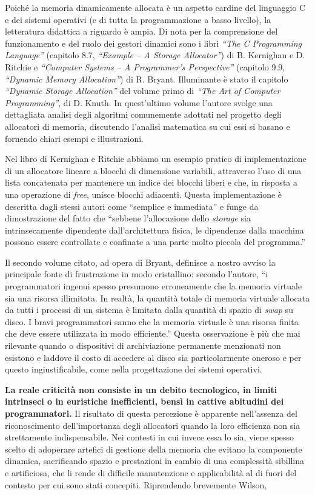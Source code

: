 Poiché la memoria dinamicamente allocata è un aspetto cardine del linguaggio C e dei sistemi operativi (e di tutta la programmazione a basso livello), la letteratura didattica a riguardo è ampia. Di nota per la comprensione del funzionamento e del ruolo dei gestori dinamici sono i libri \textit{``The C Programming Language''} (capitolo 8.7, \textit{``Example – A Storage Allocator''}) di B. Kernighan e D. Ritchie\cite{kernighan1988} e \textit{``Computer Systems – A Programmer’s Perspective''} (capitolo 9.9, \textit{``Dynamic Memory Allocation''}) di R. Bryant\cite{bryant2015}. Illuminante è stato il capitolo \textit{``Dynamic Storage Allocation''} del volume primo di \textit{``The Art of Computer Programming''}, di D. Knuth\cite{knuth1997}. In quest'ultimo volume l'autore svolge una dettagliata analisi degli algoritmi comunemente adottati nel progetto degli allocatori di memoria, discutendo l’analisi matematica su cui essi si basano e fornendo chiari esempi e illustrazioni.

Nel libro di Kernighan e Ritchie abbiamo un esempio pratico di implementazione di un allocatore lineare a blocchi di dimensione variabili, attraverso l’uso di una lista concatenata per mantenere un indice dei blocchi liberi e che, in risposta a una operazione di \textit{free}, unisce blocchi adiacenti. Questa implementazione è descritta dagli stessi autori come ``semplice e immediata'' e funge da dimostrazione del fatto che ``sebbene l’allocazione dello \textit{storage} sia intrinsecamente dipendente dall’architettura fisica, le dipendenze dalla macchina possono essere controllate e confinate a una parte molto piccola del programma.''

Il secondo volume citato, ad opera di Bryant, definisce a nostro avviso la principale fonte di frustrazione in modo cristallino: secondo l’autore, ``i programmatori ingenui spesso presumono erroneamente che la memoria virtuale sia una risorsa illimitata. In realtà, la quantità totale di memoria virtuale allocata da tutti i processi di un sistema è limitata dalla quantità di spazio di \textit{swap} su disco. I bravi programmatori sanno che la memoria virtuale è una risorsa finita che deve essere utilizzata in modo efficiente.'' Questa osservazione è più che mai rilevante quando o dispositivi di archiviazione permanente menzionati non esistono e laddove il costo di accedere al disco sia particolarmente oneroso e per questo ingiustificabile, come nella progettazione dei sistemi operativi.

\textbf{La reale criticità non consiste in un debito tecnologico, in limiti intrinseci o in euristiche inefficienti, bensì in cattive abitudini dei programmatori.} Il risultato di questa percezione è apparente nell’assenza del riconoscimento dell’importanza degli allocatori quando la loro efficienza non sia strettamente indispensabile. Nei contesti in cui invece essa lo sia, viene spesso scelto di adoperare artefici di gestione della memoria che evitano la componente dinamica, sacrificando spazio e prestazioni in cambio di una complessità sibillina e artificiosa, che li rende di difficile manutenzione e applicabilità al di fuori del contesto per cui sono stati concepiti. Riprendendo brevemente Wilson,

